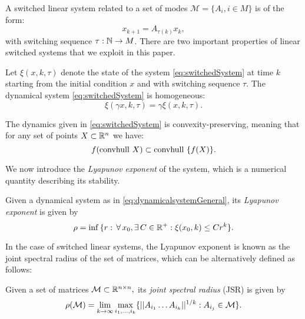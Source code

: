 A switched linear system related to a set of modes $\mathcal{M}= \{A_i, i \in M \}$ is of the form:
\begin{equation}\label{eq:switchedSystem}x_{k+1} = A_{\tau(k)}x_k,\end{equation}
with switching sequence $\tau: \mathbb{N} \to M$. There are two important properties of linear switched systems that we exploit in this paper.
\begin{property}\label{property:homogeneity}
Let $\xi(x, k, \tau)$ denote the state of the system \eqref{eq:switchedSystem} at time $k$ starting from the initial condition $x$ and with switching sequence $\tau$. The dynamical system \eqref{eq:switchedSystem} is homogeneous:
$$\xi(\gamma x, k, \tau)= \gamma \xi(x, k, \tau). $$
\end{property}
\begin{property}\label{property:convpres}
The dynamics given in \eqref{eq:switchedSystem} is convexity-preserving, meaning that for any set of points $X \subset \mathbb{R}^n$ we have:
$$ f(\mbox{convhull }{X})\subset \mbox{convhull }\{f(X)\}. $$
\end{property}

We now introduce the \emph{Lyapunov exponent} of the system, which is a numerical quantity describing its stability.
\begin{definition}Given a dynamical system as in \eqref{eq:dynamicalsystemGeneral}, its \emph{Lyapunov exponent} is given by
$$\rho =\inf{\{r:\,\forall\, x_0, \exists\, C\in \mathbb{R}^+: \xi(x_0, k)\leq Cr^k\}}. $$
\end{definition}

In the case of switched linear systems, the Lyapunov exponent is known as the joint spectral radius of the set of matrices, which can be alternatively defined as follows:
\begin{definition} \cite{jungers_lncis} Given a set of matrices $\mathcal{M} \subset \mathbb{R}^{n\times n},$ its \emph{joint spectral radius} (JSR) is given by
$$\rho(\mathcal{M}) =\lim_{k\rightarrow \infty} \max_{i_1,\dots, i_k}\{||A_{i_1} \dots A_{i_k}||^{1/k}: A_{i_j}\in\mathcal{M}\}. $$
\end{definition}

